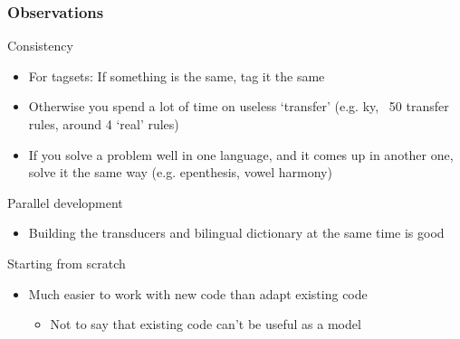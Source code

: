 \documentclass[10pt,xetex]{beamer} %
\begin{document}
\begin{frame}
  \frametitle{Observations}

\begin{block}{Consistency}
  \begin{itemize}
      \item For tagsets: If something is the same, tag it the same
      \item Otherwise you spend a lot of time on useless `transfer'
        (e.g. ky, ~50 transfer rules, around 4 `real' rules)
      \item If you solve a problem well in one language, and it comes up 
        in another one, solve it the same way (e.g. epenthesis, vowel harmony)
  \end{itemize}
\end{block}

\begin{block}{Parallel development}
  \begin{itemize}
    \item Building the transducers and bilingual dictionary at the same time is good %
  \end{itemize}
\end{block}

\begin{block}{Starting from scratch}
  \begin{itemize}
    \item Much easier to work with new code than adapt existing code
    \begin{itemize}
      \item Not to say that existing code can't be useful as a model 
    \end{itemize}
  \end{itemize}
\end{block}

\end{frame}
\end{document}
